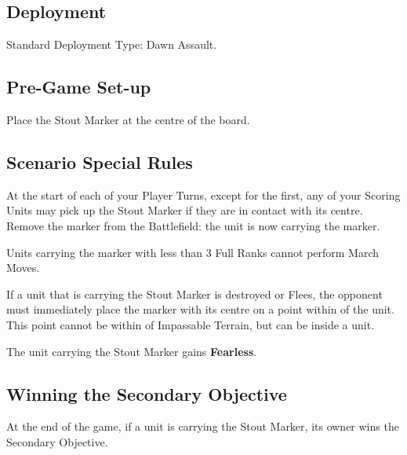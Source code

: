 
\label{BarrelOfStout}


\subsection*{Deployment}

Standard Deployment Type: Dawn Assault.


\subsection*{Pre-Game Set-up}

Place the Stout Marker at the centre of the board.

\subsection*{Scenario Special Rules}

At the start of each of your Player Turns, except for the first, any of your Scoring Units may pick up the Stout Marker if they are in contact with its centre. Remove the marker from the Battlefield: the unit is now carrying the marker.

Units carrying the marker with less than 3 Full Ranks cannot perform March Moves.

If a unit that is carrying the Stout Marker is destroyed or Flees, the opponent must immediately place the marker with its centre on a point within  of the unit. This point cannot be within  of Impassable Terrain, but can be inside a unit.

The unit carrying the Stout Marker gains \textbf{Fearless}.

\subsection*{Winning the Secondary Objective}

At the end of the game, if a unit is carrying the Stout Marker, its owner wins the Secondary Objective.
